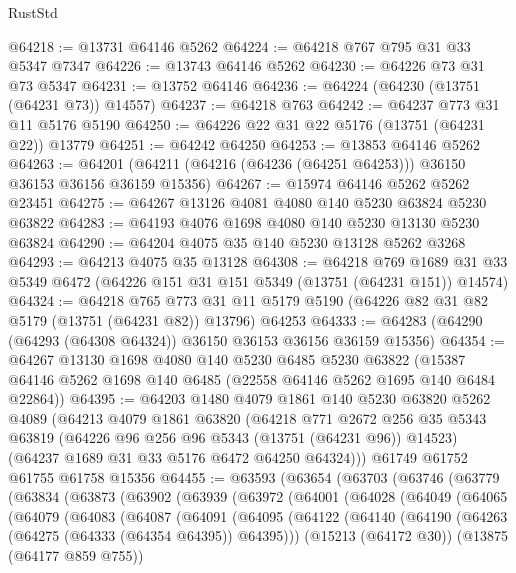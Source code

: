 \begin{lexlean}{RustStd}
\begin{coremodule}
@64218 := @13731 @64146 @5262
@64224 := @64218 @767 @795 @31 @33 @5347 @7347
@64226 := @13743 @64146 @5262
@64230 := @64226 @73 @31 @73 @5347
@64231 := @13752 @64146
@64236 := @64224 (@64230 (@13751 (@64231 @73)) @14557)
@64237 := @64218 @763
@64242 := @64237 @773 @31 @11 @5176 @5190
@64250 := @64226 @22 @31 @22 @5176 (@13751 (@64231 @22)) @13779
@64251 := @64242 @64250
@64253 := @13853 @64146 @5262
@64263 := @64201 (@64211 (@64216 (@64236 (@64251 @64253))) @36150 @36153 @36156 @36159 @15356)
@64267 := @15974 @64146 @5262 @5262 @23451
@64275 := @64267 @13126 @4081 @4080 @140 @5230 @63824 @5230 @63822
@64283 := @64193 @4076 @1698 @4080 @140 @5230 @13130 @5230 @63824
@64290 := @64204 @4075 @35 @140 @5230 @13128 @5262 @3268
@64293 := @64213 @4075 @35 @13128
@64308 := @64218
    @769
    @1689
    @31
    @33
    @5349
    @6472
    (@64226 @151 @31 @151 @5349 (@13751 (@64231 @151)) @14574)
@64324 := @64218
    @765
    @773
    @31
    @11
    @5179
    @5190
    (@64226 @82 @31 @82 @5179 (@13751 (@64231 @82)) @13796)
    @64253
@64333 := @64283 (@64290 (@64293 (@64308 @64324)) @36150 @36153 @36156 @36159 @15356)
@64354 := @64267
    @13130
    @1698
    @4080
    @140
    @5230
    @6485
    @5230
    @63822
    (@15387 @64146 @5262 @1698 @140 @6485 (@22558 @64146 @5262 @1695 @140 @6484 @22864))
@64395 := @64203
    @1480
    @4079
    @1861
    @140
    @5230
    @63820
    @5262
    @4089
    (@64213
      @4079
      @1861
      @63820
      (@64218
        @771
        @2672
        @256
        @35
        @5343
        @63819
        (@64226 @96 @256 @96 @5343 (@13751 (@64231 @96)) @14523)
        (@64237 @1689 @31 @33 @5176 @6472 @64250 @64324)))
    @61749
    @61752
    @61755
    @61758
    @15356
@64455 := @63593
    (@63654
      (@63703
        (@63746
          (@63779
            (@63834
              (@63873
                (@63902
                  (@63939
                    (@63972
                      (@64001
                        (@64028
                          (@64049
                            (@64065
                              (@64079
                                (@64083
                                  (@64087
                                    (@64091
                                      (@64095
                                        (@64122
                                          (@64140
                                            (@64190
                                              (@64263 (@64275 (@64333 (@64354 @64395)) @64395)))
                                            (@15213 (@64172 @30))
                                            (@13875 (@64177 @859 @755))

\end{coremodule}
\end{lexlean}
